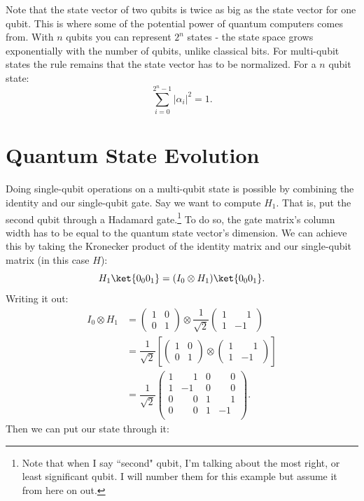 \documentclass[11pt, notitlepage]{report}
\newcommand{\igate}{
  \begin{pmatrix}
  1 & 0 \\
  0 & 1
  \end{pmatrix}
}
\newcommand{\hgate}{
  \dfrac{1}{\sqrt2}
  \begin{pmatrix}
  1 & \phantom{-}1 \\
  1 & -1
  \end{pmatrix}
}
\begin{document}
Note that the state vector of two qubits is twice as big as the state vector for one qubit. This is where some of the potential power of quantum computers comes from. With $n$ qubits you can represent $2^n$ states - the state space grows exponentially with the number of qubits, unlike classical bits. For multi-qubit states the rule remains that the state vector has to be normalized. For a $n$ qubit state:
\begin{equation}
  \sum_{i = 0}^{2^n-1} |\alpha_i|^2 = 1.
\end{equation}

\section{Quantum State Evolution}
Doing single-qubit operations on a multi-qubit state is possible by combining the identity and our single-qubit gate. Say we want to compute $H_1$. That is, put the second qubit through a Hadamard gate.\footnote{Note that when I say ``second" qubit, I'm talking about the most right, or least significant qubit. I will number them for this example but assume it from here on out.} To do so, the gate matrix's column width has to be equal to the quantum state vector's dimension. We can achieve this by taking the Kronecker product of the identity matrix and our single-qubit matrix (in this case $H$):
\begin{equation}
  H_1\ket{0_0 0_1} = (I_0 \otimes H_1)\ket{0_0 0_1}.
\end{equation}
Writing it out:
\begin{align}
  I_0 \otimes H_1 &=
  \igate{} \otimes \hgate{} \\
  &=
  \dfrac{1}{\sqrt2}
  \left[
  \igate{}
  \otimes
  \begin{pmatrix}
  1 & \phantom{-}1 \\
  1 & -1
  \end{pmatrix}
  \right] \\
  &= \dfrac{1}{\sqrt2}
  \begin{pmatrix}
  1 & \phantom{-}1 & 0 & \phantom{-}0 \\
  1 & -1 & 0 & \phantom{-}0 \\
  0 & \phantom{-}0 & 1 & \phantom{-}1 \\
  0 & \phantom{-}0 & 1 & -1 \\
  \end{pmatrix}.
\end{align}
Then we can put our  state through it:
\end{document}
